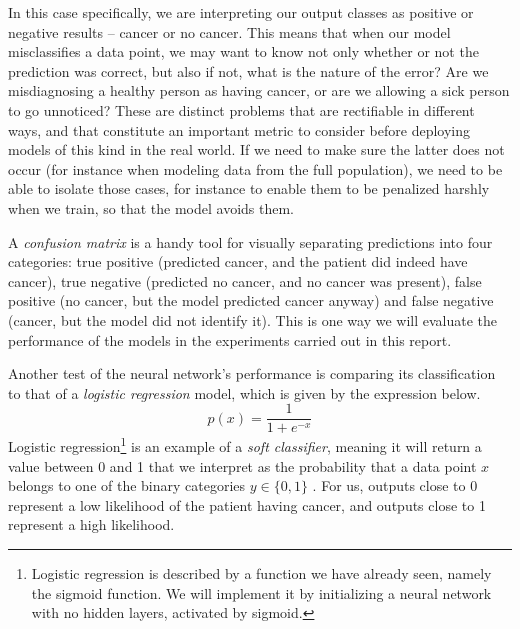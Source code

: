In this case specifically, we are interpreting our output classes as positive or negative results -- cancer or no cancer. This means that when our model misclassifies a data point, we may want to know not only whether or not the prediction was correct, but also if not, what is the nature of the error? Are we misdiagnosing a healthy person as having cancer, or are we allowing a sick person to go unnoticed? These are distinct problems that are rectifiable in different ways, and that constitute an important metric to consider before deploying models of this kind in the real world. If we need to make sure the latter does not occur (for instance when modeling data from the full population), we need to be able to isolate those cases, for instance to enable them to be penalized harshly when we train, so that the model avoids them. 

A \emph{confusion matrix} is a handy tool for visually separating predictions into four categories: true positive (predicted cancer, and the patient did indeed have cancer), true negative (predicted no cancer, and no cancer was present), false positive (no cancer, but the model predicted cancer anyway) and false negative (cancer, but the model did not identify it). This is one way we will evaluate the performance of the models in the experiments carried out in this report.

Another test of the neural network's performance is comparing its classification to that of a \emph{logistic regression} model, which is given by the expression below.
\[p(x) = \frac{1}{1 + e^{-x}}\]
Logistic regression\footnote{Logistic regression is described by a function we have already seen, namely the sigmoid function. We will implement it by initializing a neural network with no hidden layers, activated by sigmoid.} is an example of a \emph{soft classifier}, meaning it will return a value between 0 and 1 that we interpret as the probability that a data point $x$ belongs to one of the binary categories $y \in \{0,1\}$ \cite{MHJlogisticregression}. For us, outputs close to 0 represent a low likelihood of the patient having cancer, and outputs close to 1 represent a high likelihood.

